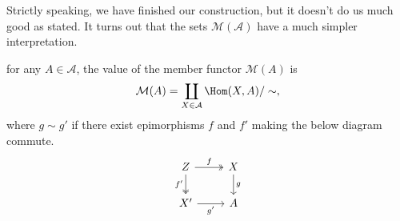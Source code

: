 \documentclass[main.tex]{subfiles}
\begin{document}
Strictly speaking, we have finished our construction, but it doesn't do us much good as stated. It turns out that the sets $\mathcal{M}(\mathcal{A})$ have a much simpler interpretation.

\begin{proposition}
  \label{prop:formula_for_member_functor}
  for any $A \in \mathcal{A}$, the value of the member functor $\mathcal{M}(A)$ is
  \begin{equation*}
    \mathcal{M}(A) = \coprod_{X \in \mathcal{A}}\Hom(X, A) / \sim,
  \end{equation*}
  where $g \sim g'$ if there exist epimorphisms $f$ and $f'$ making the below diagram commute.
  \begin{equation*}
    \begin{tikzcd}
      Z
      \arrow[r, twoheadrightarrow, "f"]
      \arrow[d, twoheadrightarrow, swap, "f'"]
      & X
      \arrow[d, "g"]
      \\
      X'
      \arrow[r, swap, "g'"]
      & A
    \end{tikzcd}
  \end{equation*}
\end{proposition}
\end{document}
